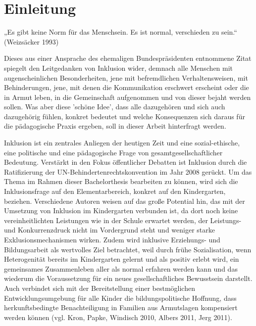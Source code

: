 \chapter{Einleitung}

„Es gibt keine Norm für das Menschsein. Es ist normal, verschieden zu sein.“ (Weizsäcker 1993)
 
Dieses aus einer Ansprache des ehemaligen Bundespräsidenten entnommene Zitat spiegelt den Leitgedanken von Inklusion wider, demnach alle Menschen mit augenscheinlichen Besonderheiten, jene mit befremdlichen Verhaltensweisen, mit Behinderungen, jene, mit denen die Kommunikation erschwert erscheint oder die in Armut leben, in die Gemeinschaft aufgenommen und von dieser bejaht werden sollen. 
Was aber diese 'schöne Idee', dass alle dazugehören und sich auch dazugehörig fühlen, konkret bedeutet und welche Konsequenzen sich daraus für die pädagogische Praxis ergeben, soll in dieser Arbeit hinterfragt werden.

Inklusion ist ein zentrales Anliegen der heutigen Zeit und eine sozial-ethische, eine politische und eine pädagogische Frage von gesamtgesellschaftlicher Bedeutung. Verstärkt in den Fokus öffentlicher Debatten ist Inklusion durch die Ratifizierung der UN-Behindertenrechtskonvention im Jahr 2008 gerückt.
Um das Thema im Rahmen dieser Bachelorthesis bearbeiten zu können, wird 
sich die Inklusionsfrage auf den Elementarbereich, konkret auf den Kindergarten, beziehen. Verschiedene Autoren weisen auf das große Potential hin, das mit der Umsetzung von Inklusion im Kindergarten verbunden ist, da dort noch keine vereinheitlichten Leistungen wie in der Schule erwartet werden, der Leistungs- und Konkurrenzdruck nicht im Vordergrund steht und weniger starke Exklusionsmechanismen wirken. Zudem wird inklusive Erziehungs- und Bildungsarbeit als wertvolles Ziel betrachtet, weil durch frühe Sozialisation, wenn Heterogenität bereits im Kindergarten gelernt und als positiv erlebt wird, ein gemeinsames Zusammenleben aller als normal erfahren werden kann und das wiederum die Voraussetzung für ein neues gesellschaftliches Bewusstsein darstellt. Auch verbindet sich mit der Bereitstellung einer bestmöglichen Entwicklungsumgebung für alle Kinder die bildungspolitische Hoffnung, dass herkunftsbedingte Benachteiligung in Familien aus Armutslagen kompensiert werden können (vgl. Kron, Papke, Windisch 2010, Albers 2011, Jerg 2011). 

